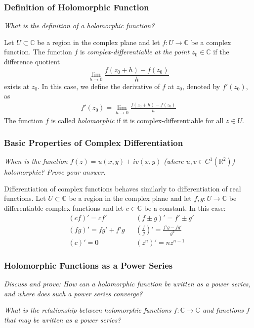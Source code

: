 \documentclass[11pt, a4paper]{article}
\newcommand{\question}[1]{\textit{#1}\vspace{2mm}}
\newcommand{\R}{\mathbb{R}} %
\newcommand{\C}{\mathbb{C}} %
\begin{document}
\subsubsection{Definition of  Holomorphic Function}
\question{What is the definition of a holomorphic function?}

Let $ U \subset \C $ be a region in the complex plane and let $ f : U \to \C $ be a complex function. The function $ f $ is \textit{complex-differentiable at the point $ z_0 \in \C $} if the difference quotient
\begin{equation*}
	\lim_{h \to 0} \frac{f(z_0 + h) - f(z_0)}{h}
\end{equation*} 
exists at $ z_0 $. In this case, we define the derivative of $ f $ at $ z_0 $, denoted by $ f'(z_0) $, as
\begin{align*}
	f'(z_0) = \lim_{h \to 0} \frac{f(z_0 + h) - f(z_0)}{h}
\end{align*}
The function $ f $ is called \textit{holomorphic} if it is complex-differentiable for all $ z \in U $.

\subsubsection{Basic Properties of Complex Differentiation}
\question{When is the function $ f(z) = u(x, y) + iv(x, y) $ (where $ u, v \in C^{1}(\R^2)$) holomorphic? Prove your answer. }

Differentiation of complex functions behaves similarly to differentiation of real functions. Let $ U \subset \C $ be a region in the complex plane and let $ f, g : U \to \C $ be differentiable complex functions and let $ c \in \C $ be a constant. In this case:
\begin{align*}
	&(cf)' = cf' && (f \pm g)' = f' \pm g'\\
	&(fg)' = fg' + f'g && \left(\frac{f}{g}\right)'= \frac{f'g - fg'}{g^2}\\
	&(c)' = 0 & &\left(z^n\right)'= n z^{n-1}
\end{align*}

\subsubsection{Holomorphic Functions as a Power Series}
\question{Discuss and prove: How can a holomorphic function be written as a power series, and where does such a power series converge?}
	
\textit{What is the relationship between holomorphic functions $ f:\C \to \C $ and functions $ f $ that may be written as a power series?}
	
\end{document}
